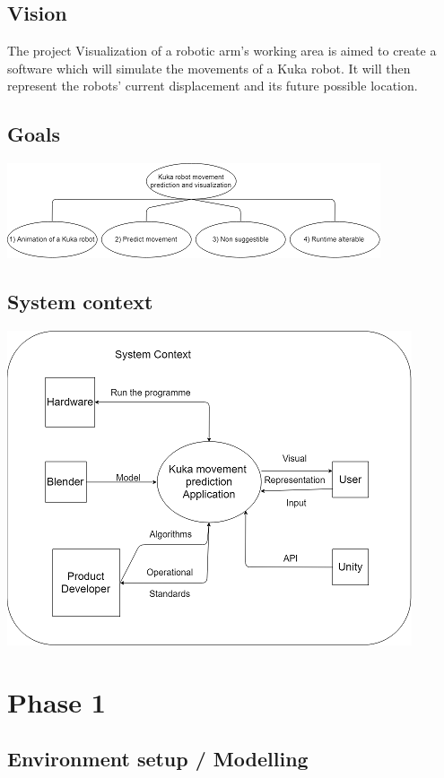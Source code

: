 \documentclass{scrartcl}
\begin{document}
\subsection{Vision}

The project Visualization of a robotic arm’s working area is aimed to create a software which will simulate the movements of a Kuka robot. 
It will then represent the robots’ current displacement and its future possible location. 

\subsection{Goals}

\includegraphics{Goals}

\subsection{System context}

\includegraphics{SystemContext}

\clearpage

\section{Phase 1}
\subsection{Environment setup / Modelling}
\end{document}
